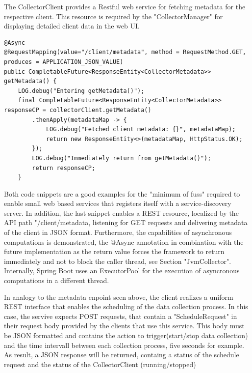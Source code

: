 The CollectorClient provides a Restful web service for fetching metadata for the respective client. This resource is required by
the "CollectorManager" for displaying detailed client data in the web UI.

\begin{lstlisting}[caption={"ClientMetadataController", Metadata REST endpoint}, captionpos=b, label={lst:metadata-endpoint}]
@Async
@RequestMapping(value="/client/metadata", method = RequestMethod.GET, produces = APPLICATION_JSON_VALUE)
public CompletableFuture<ResponseEntity<CollectorMetadata>> getMetadata() {
    LOG.debug("Entering getMetadata()");
    final CompletableFuture<ResponseEntity<CollectorMetadata>> responseCP = collectorClient.getMetadata()
        .thenApply(metadataMap -> {
            LOG.debug("Fetched client metadata: {}", metadataMap);
            return new ResponseEntity<>(metadataMap, HttpStatus.OK);
        });
        LOG.debug("Immediately return from getMetadata()");
        return responseCP;
    }
\end{lstlisting}

Both code snippets are a good examples for the "minimum of fuss" required to enable small web based services that registers itself
with a service-discovery server. In addition, the last snippet enables a REST resource, localized by the API
path "/client/metadata, listening for GET requests and delivering metadata of the client in JSON format. Furthermore, the capabilities
of asynchronous computations is demonstrated, the @Async annotation in combination with the future implementation as the return
value forces the framework to return immediately and not to block the caller thread, see Section "JvmCollector". Internally,
Spring Boot uses an ExecutorPool for the execution of asyncronous computations in a different thread.

In analogy to the metadata enpoint seen above, the client realizes a uniform REST interface that enables the scheduling
of the data collection process. In this case, the servive expects POST requests, that contain a "ScheduleRequest" in their
request body provided by the clients that use this service. This body must be JSON formatted and contains the action to
trigger(start/stop data collection) and the time intervall between each collection process, five seconds for example. As result,
a JSON response will be returned, containg a status of the schedule request and the status of the CollectorClient (running/stopped)

